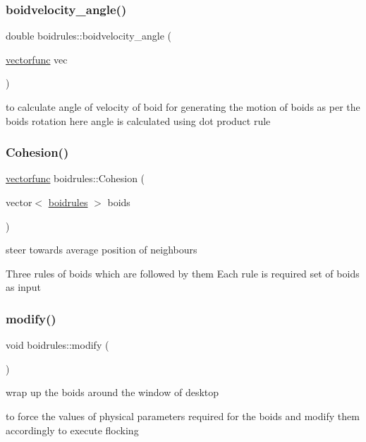 \subsubsection{\texorpdfstring{boidvelocity\+\_\+angle()}{boidvelocity\_angle()}}
{\footnotesize\ttfamily double boidrules\+::boidvelocity\+\_\+angle (\begin{DoxyParamCaption}\item[{\mbox{\hyperlink{classvectorfunc}{vectorfunc}}}]{vec }\end{DoxyParamCaption})}

to calculate angle of velocity of boid for generating the motion of boids as per the boids rotation here angle is calculated using dot product rule \mbox{\label{classboidrules_af85434ba6abc026215ac7e8d5ff586e4}} 
\subsubsection{\texorpdfstring{Cohesion()}{Cohesion()}}
{\footnotesize\ttfamily \mbox{\hyperlink{classvectorfunc}{vectorfunc}} boidrules\+::\+Cohesion (\begin{DoxyParamCaption}\item[{vector$<$ \mbox{\hyperlink{classboidrules}{boidrules}} $>$}]{boids }\end{DoxyParamCaption})}



steer towards average position of neighbours 

Three rules of boids which are followed by them Each rule is required set of boids as input \mbox{\label{classboidrules_a6d350244d405926d30cd36e3f1faa85d}} 
\subsubsection{\texorpdfstring{modify()}{modify()}}
{\footnotesize\ttfamily void boidrules\+::modify (\begin{DoxyParamCaption}{ }\end{DoxyParamCaption})}



wrap up the boids around the window of desktop 

to force the values of physical parameters required for the boids and modify them accordingly to execute flocking \mbox{\label{classboidrules_adeeb0bcb15cc3461fc521ce416d3266e}} 
